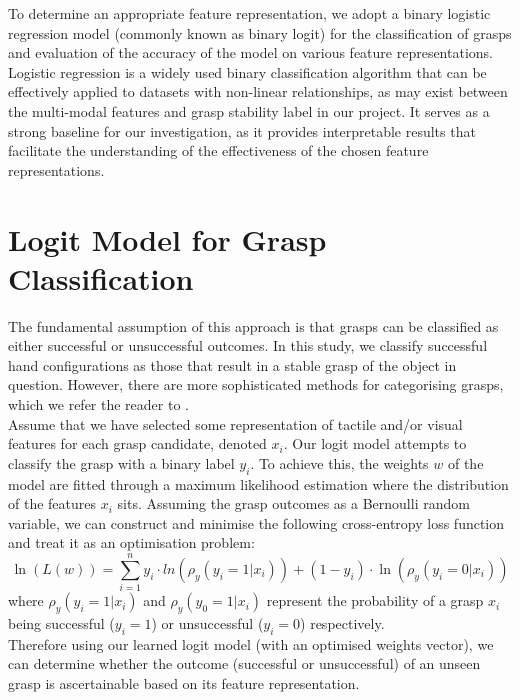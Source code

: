 \documentclass[11pt, a4paper]{report}
\begin{document}
To determine an appropriate feature representation, we adopt a binary logistic regression model (commonly known as binary logit) for the classification of grasps and evaluation of the accuracy of the model on various feature representations. Logistic regression is a widely used binary classification algorithm that can be effectively applied to datasets with non-linear relationships, as may exist between the multi-modal features and grasp stability label in our project. It serves as a strong baseline for our investigation, as it provides interpretable results that facilitate the understanding of the effectiveness of the chosen feature representations.\\


\section{Logit Model for Grasp Classification}
\label{sec:4.1}
The fundamental assumption of this approach is that grasps can be classified as either successful or unsuccessful outcomes.  In this study, we classify successful hand configurations as those that result in a stable grasp of the object in question. However, there are more sophisticated methods for categorising grasps, which we refer the reader to \cite{Bekiroglu2012LearningTA, si2022grasp}.\\

Assume that we have selected some representation of tactile and/or visual features for each grasp candidate, denoted $x_i$. Our logit model attempts to classify the grasp with a binary label $y_i$. To achieve this, the weights $w$ of the model are fitted through a maximum likelihood estimation where the distribution of the features $x_i$ sits. Assuming the grasp outcomes as a Bernoulli random variable, we can construct and minimise the following cross-entropy loss function and treat it as an optimisation problem:
\begin{equation}
    \ln(L(w))=\sum^n_{i=1}y_i\cdot ln(\rho_y(y_i=1|x_i))+(1-y_i)\cdot\ln(\rho_y(y_i=0|x_i))
\end{equation}
where $\rho_y(y_i=1|x_i)$ and $\rho_y(y_0=1|x_i)$ represent the probability of a grasp $x_i$ being successful ($y_i=1$) or unsuccessful ($y_i=0$) respectively.\\

Therefore using our learned logit model (with an optimised weights vector), we can determine whether the outcome (successful or unsuccessful) of an unseen grasp is ascertainable based on its feature representation.
\end{document}
